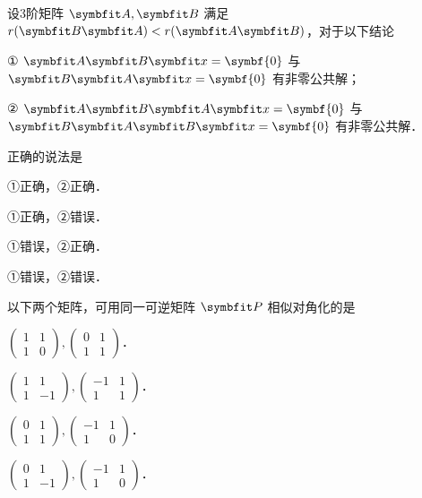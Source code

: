 \begin{question}[index=5]
设3阶矩阵 $\symbfit A,\symbfit B$ 满足 $r(\symbfit B\symbfit A)<r(\symbfit A\symbfit B)$，对于以下结论\par
① $\symbfit A\symbfit B\symbfit x=\symbf{0}$ 与 $\symbfit B\symbfit A\symbfit x=\symbf{0}$ 有非零公共解；\par
② $\symbfit A\symbfit B\symbfit A\symbfit x=\symbf{0}$ 与 $\symbfit B\symbfit A\symbfit B\symbfit x=\symbf{0}$ 有非零公共解．\par
正确的说法是
\begin{choices}[columns=2]
\item ①正确，②正确．
\item ①正确，②错误．
\item ①错误，②正确．
\item ①错误，②错误．
\end{choices}
\end{question}
\QuestionBreak

\begin{question}[index=6]
以下两个矩阵，可用同一可逆矩阵 $\symbfit P$ 相似对角化的是
\begin{choices}[columns=2,label-pos=left]
\item $\begin{pmatrix}1&1\\1&0\end{pmatrix},\begin{pmatrix}0&1\\1&1\end{pmatrix}$．
\item $\begin{pmatrix}1&1\\1&-1\end{pmatrix},\begin{pmatrix}-1&1\\1&1\end{pmatrix}$．
\item $\begin{pmatrix}0&1\\1&1\end{pmatrix},\begin{pmatrix}-1&1\\1&0\end{pmatrix}$．
\item $\begin{pmatrix}0&1\\1&-1\end{pmatrix},\begin{pmatrix}-1&1\\1&0\end{pmatrix}$．
\end{choices}
\end{question}
\QuestionBreak

